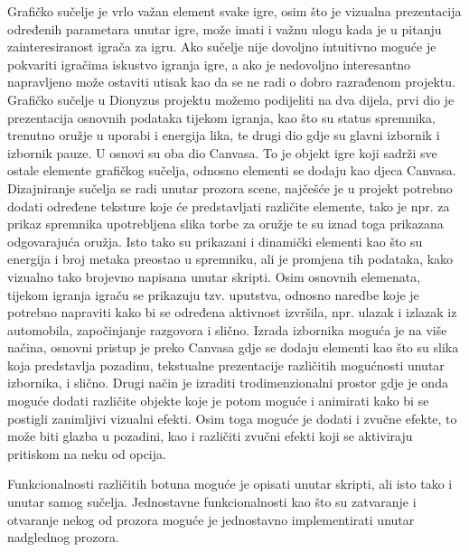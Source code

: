 Grafičko sučelje je vrlo važan element svake igre, osim što je vizualna prezentacija određenih parametara unutar igre, može imati i važnu ulogu kada je u pitanju zainteresiranost igrača za igru. Ako sučelje nije dovoljno intuitivno moguće je pokvariti igračima iskustvo igranja igre, a ako je nedovoljno interesantno napravljeno može ostaviti utisak kao da se ne radi o dobro razrađenom projektu.
Grafičko sučelje u Dionyzus projektu možemo podijeliti na dva dijela, prvi dio je prezentacija osnovnih podataka tijekom igranja, kao što su status spremnika, trenutno oružje u uporabi i energija lika, te drugi dio gdje su glavni izbornik i izbornik pauze. U osnovi su oba dio Canvasa. To je objekt igre koji sadrži sve ostale elemente grafičkog sučelja, odnosno elementi se dodaju kao djeca Canvasa. Dizajniranje sučelja se radi unutar prozora scene, najčešće je u projekt potrebno dodati određene teksture koje će predstavljati različite elemente, tako je npr. za prikaz spremnika upotrebljena slika torbe za oružje te su iznad toga prikazana odgovarajuća oružja. Isto tako su prikazani i dinamički elementi kao što su energija i broj metaka preostao u spremniku, ali je promjena tih podataka, kako vizualno tako brojevno napisana unutar skripti. 
Osim osnovnih elemenata, tijekom igranja igraču se prikazuju tzv. uputstva, odnosno naredbe koje je potrebno napraviti kako bi se određena aktivnost izvršila, npr. ulazak i izlazak iz automobila, započinjanje razgovora i slično.
Izrada izbornika moguća je na više načina, osnovni pristup je preko Canvasa gdje se dodaju elementi kao što su slika koja predstavlja pozadinu, tekstualne prezentacije različitih mogućnosti unutar izbornika, i slično. Drugi način je izraditi trodimenzionalni prostor gdje je onda moguće dodati različite objekte koje je potom moguće i animirati kako bi se postigli zanimljivi vizualni efekti. Osim toga moguće je dodati i zvučne efekte, to može biti glazba u pozadini, kao i različiti zvučni efekti koji se aktiviraju pritiskom na neku od opcija. 

Funkcionalnosti različitih botuna moguće je opisati unutar skripti, ali isto tako i unutar samog sučelja. Jednostavne funkcionalnosti kao što su zatvaranje i otvaranje nekog od prozora moguće je jednostavno implementirati unutar nadglednog prozora.